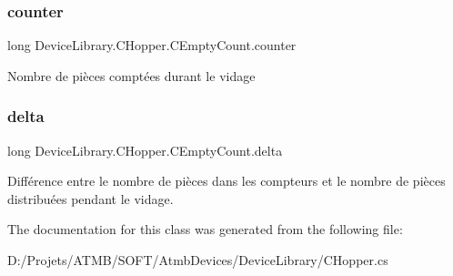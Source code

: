 \subsubsection{\texorpdfstring{counter}{counter}}
{\footnotesize\ttfamily long Device\+Library.\+C\+Hopper.\+C\+Empty\+Count.\+counter}



Nombre de pièces comptées durant le vidage 

\mbox{\label{class_device_library_1_1_c_hopper_1_1_c_empty_count_adf61aa1680a4934d9e2e6ebc47734e5a}} 
\subsubsection{\texorpdfstring{delta}{delta}}
{\footnotesize\ttfamily long Device\+Library.\+C\+Hopper.\+C\+Empty\+Count.\+delta}



Différence entre le nombre de pièces dans les compteurs et le nombre de pièces distribuées pendant le vidage. 



The documentation for this class was generated from the following file\+:\begin{DoxyCompactItemize}
\item 
D\+:/\+Projets/\+A\+T\+M\+B/\+S\+O\+F\+T/\+Atmb\+Devices/\+Device\+Library/C\+Hopper.\+cs\end{DoxyCompactItemize}
